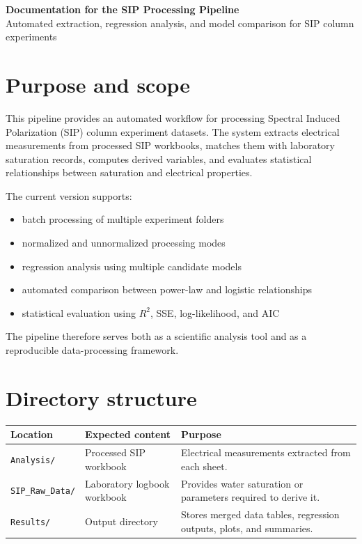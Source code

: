 \documentclass[11pt]{article}
\begin{document}
\begin{center}
{\LARGE\bfseries\color{accent} Documentation for the SIP Processing Pipeline}\\[0.4em]
{\large Automated extraction, regression analysis, and model comparison for SIP column experiments}
\end{center}

\section{Purpose and scope}

This pipeline provides an automated workflow for processing Spectral Induced Polarization (SIP) column experiment datasets.  
The system extracts electrical measurements from processed SIP workbooks, matches them with laboratory saturation records, computes derived variables, and evaluates statistical relationships between saturation and electrical properties.

The current version supports:

\begin{itemize}[leftmargin=1.5em]
\item batch processing of multiple experiment folders
\item normalized and unnormalized processing modes
\item regression analysis using multiple candidate models
\item automated comparison between power-law and logistic relationships
\item statistical evaluation using $R^2$, SSE, log-likelihood, and AIC
\end{itemize}

The pipeline therefore serves both as a scientific analysis tool and as a reproducible data-processing framework.

\section{Directory structure}

\begin{longtable}{p{} p{} p{}}
\toprule
\textbf{Location} & \textbf{Expected content} & \textbf{Purpose}\\
\midrule
\endhead
\texttt{Analysis/} & Processed SIP workbook & Electrical measurements extracted from each sheet.\\
\texttt{SIP\_Raw\_Data/} & Laboratory logbook workbook & Provides water saturation or parameters required to derive it.\\
\texttt{Results/} & Output directory & Stores merged data tables, regression outputs, plots, and summaries.\\
\bottomrule
\end{longtable}
\end{document}
